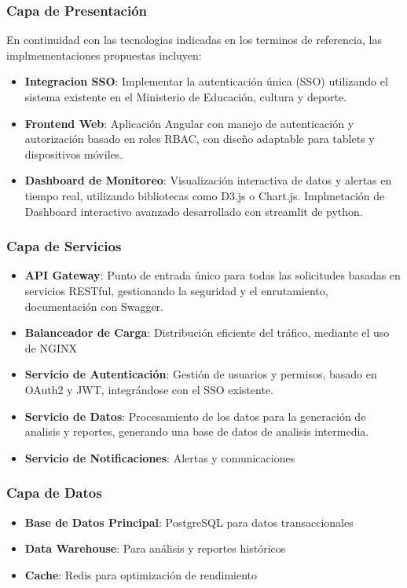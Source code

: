 \subsubsection{Capa de Presentación}
En continuidad con las tecnologias indicadas en los terminos de referencia, las implmementaciones propuestas incluyen:
\begin{itemize}
    \item \textbf{Integracion SSO}: Implementar la autenticación única (SSO) utilizando el sistema existente en el Ministerio de Educación, cultura y deporte.
    \item \textbf{Frontend Web}: Aplicación Angular con manejo de autenticación y autorización basado en roles RBAC, con diseño adaptable para tablets y dispositivos móviles.
    \item \textbf{Dashboard de Monitoreo}: Visualización interactiva de datos y alertas en tiempo real, utilizando bibliotecas como D3.js o Chart.js.
    Implmetación de Dashboard interactivo avanzado desarrollado con streamlit de python.
\end{itemize}

\subsubsection{Capa de Servicios}
\begin{itemize}
    \item \textbf{API Gateway}: Punto de entrada único para todas las solicitudes basadas en servicios RESTful, gestionando la seguridad y el enrutamiento, documentación con Swagger.
    \item \textbf{Balanceador de Carga}: Distribución eficiente del tráfico, mediante el uso de NGINX
    \item \textbf{Servicio de Autenticación}: Gestión de usuarios y permisos, basado en OAuth2 y JWT, integrándose con el SSO existente.
    \item \textbf{Servicio de Datos}: Procesamiento de los datos para la generación de analisis y reportes, generando una base de datos de analisis intermedia.
    \item \textbf{Servicio de Notificaciones}: Alertas y comunicaciones
\end{itemize}

\subsubsection{Capa de Datos}
\begin{itemize}
    \item \textbf{Base de Datos Principal}: PostgreSQL para datos transaccionales
    \item \textbf{Data Warehouse}: Para análisis y reportes históricos
    \item \textbf{Cache}: Redis para optimización de rendimiento
\end{itemize}

